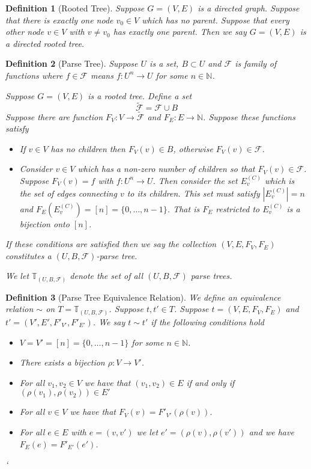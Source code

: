 \documentclass[12pt]{article}
\theoremstyle{break}
\newtheorem{definition}{Definition}[section]
\theoremstyle{break}
\theoremstyle{break}
\theoremstyle{break}
\theoremstyle{break}
\newtheorem{informal definition}[definition]{Informal Definition}
\begin{document}
\begin{definition}[Rooted Tree]
Suppose $G=(V, E)$ is a directed graph.
Suppose that there is exactly one node $v_0 \in V$ which has no parent.
Suppose that every other node $v\in V$ with $v\not=v_0$ has exactly one parent.
Then we say $G=(V, E)$ is a directed rooted tree.
\end{definition}

\begin{definition}[Parse Tree]
Suppose $U$ is a set, $B\subset U$ and $\mathcal{F}$ is family of functions where $f\in \mathcal{F}$ means $f:U^n \to U$ for some $n\in \mathbb{N}$.

Suppose $G=(V, E)$ is a rooted tree.
Define a set
$$
\tilde{\mathcal{F}} = \mathcal{F} \cup B
$$
Suppose there are function $F_V:V \to \tilde{\mathcal{F}}$ and $F_E:E \to \mathbb{N}$.
Suppose these functions satisfy
\begin{itemize}
\item{If $v\in V$ has no children then $F_V(v) \in B$, otherwise $F_V(v) \in \mathcal{F}$.}
\item{Consider $v\in V$ which has a non-zero number of children so that $F_V(v) \in \mathcal{F}$. Suppose $F_V(v) = f$ with $f:U^n \to U$. Then consider the set $E^{(C)}_v$ which is the set of edges connecting $v$ to its children. This set must satisfy $|E^{(C)}_v| = n$ and $F_E(E^{(C)}_v) = [n] = \{0, \ldots, n-1\}$. That is $F_E$ restricted to $E^{(C)}_v$ is a bijection onto $[n]$.}
\end{itemize}

If these conditions are satisfied then we say the collection $(V, E, F_V, F_E)$ constitutes a $(U, B, \mathcal{F})$-parse tree.

We let $\mathbb{T}_{(U, B, \mathcal{F})}$ denote the set of all $(U, B, \mathcal{F})$ parse trees.
\end{definition}

\begin{definition}[Parse Tree Equivalence Relation]
We define an equivalence relation $\sim$ on $T = \mathbb{T}_{(U, B, \mathcal{F})}$.
Suppose $t, t' \in T$.
Suppose $t = (V, E, F_V, F_E)$ and $t' = (V', E', F'_{V'}, F'_{E'})$.
We say $t \sim t'$ if the following conditions hold

\begin{itemize}
\item{$V = V' = [n] = \{0, \ldots, n-1\}$ for some $n\in \mathbb{N}$.}
\item{There exists a bijection $\rho: V \to V'$.}
\item{For all $v_1, v_2 \in V$ we have that $(v_1, v_2) \in E$ if and only if $(\rho(v_1), \rho(v_2)) \in E'$}
\item{For all $v\in V$ we have that $F_V(v) = F'_{V'}(\rho(v))$.}
\item{For all $e\in E$ with $e = (v, v')$ we let $e' = (\rho(v), \rho(v'))$ and we have $F_E(e) = F'_{E'}(e')$.}
\end{itemize}`
\end{definition}
\end{document}
